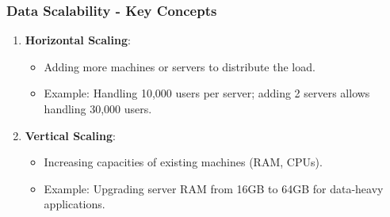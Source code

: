 \documentclass[aspectratio=169]{beamer}
\begin{document}
\begin{frame}[fragile]
  \frametitle{Data Scalability - Key Concepts}
  \begin{enumerate}
    \item \textbf{Horizontal Scaling}:
      \begin{itemize}
        \item Adding more machines or servers to distribute the load.
        \item Example: Handling 10,000 users per server; adding 2 servers allows handling 30,000 users.
      \end{itemize}
      
    \item \textbf{Vertical Scaling}:
      \begin{itemize}
        \item Increasing capacities of existing machines (RAM, CPUs).
        \item Example: Upgrading server RAM from 16GB to 64GB for data-heavy applications.
      \end{itemize}
  \end{enumerate}
\end{frame}
\end{document}
